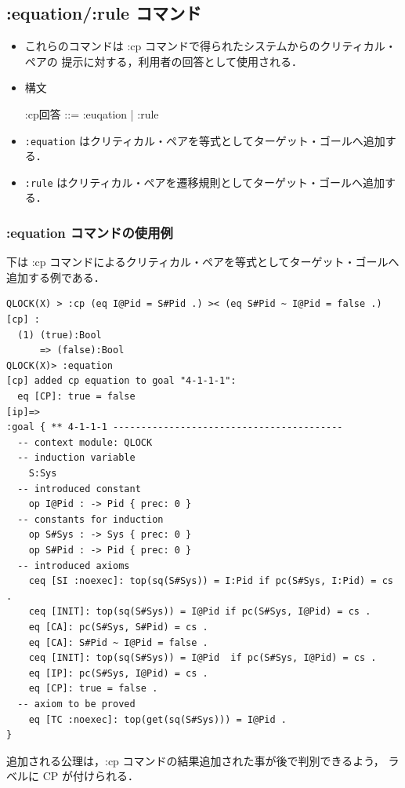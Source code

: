 \documentclass[a4paper,oneside,10pt,here]{memoir}
\newenvironment{vvtm}%
{\parskip=0pt\lineskip=0pt\begin{center}\begin{minipage}{0.8\textwidth}\begin{snugshade}}%
  {\end{snugshade}\end{minipage}\end{center}}
\begin{document}
\subsection{:equation/:rule コマンド}

\begin{itemize}
\item これらのコマンドは :cp コマンドで得られたシステムからのクリティカル・ペアの
  提示に対する，利用者の回答として使用される．
\item 構文
  \begin{vvtm}
    \begin{simplev}
      :cp回答 ::= :euqation | :rule
    \end{simplev}
  \end{vvtm}
\item \verb|:equation| はクリティカル・ペアを等式としてターゲット・ゴールへ追加する．
\item \verb|:rule| はクリティカル・ペアを遷移規則としてターゲット・ゴールへ追加する．
\end{itemize}

\subsubsection{:equation コマンドの使用例}
下は :cp コマンドによるクリティカル・ペアを等式としてターゲット・ゴールへ追加する例である．
\begin{verbatim}
QLOCK(X) > :cp (eq I@Pid = S#Pid .) >< (eq S#Pid ~ I@Pid = false .)
[cp] :
  (1) (true):Bool
      => (false):Bool
QLOCK(X)> :equation
[cp] added cp equation to goal "4-1-1-1": 
  eq [CP]: true = false
[ip]=>
:goal { ** 4-1-1-1 -----------------------------------------
  -- context module: QLOCK
  -- induction variable
    S:Sys
  -- introduced constant
    op I@Pid : -> Pid { prec: 0 }
  -- constants for induction
    op S#Sys : -> Sys { prec: 0 }
    op S#Pid : -> Pid { prec: 0 }
  -- introduced axioms
    ceq [SI :noexec]: top(sq(S#Sys)) = I:Pid if pc(S#Sys, I:Pid) = cs .
    ceq [INIT]: top(sq(S#Sys)) = I@Pid if pc(S#Sys, I@Pid) = cs .
    eq [CA]: pc(S#Sys, S#Pid) = cs .
    eq [CA]: S#Pid ~ I@Pid = false .
    ceq [INIT]: top(sq(S#Sys)) = I@Pid  if pc(S#Sys, I@Pid) = cs .
    eq [IP]: pc(S#Sys, I@Pid) = cs .
    eq [CP]: true = false .
  -- axiom to be proved
    eq [TC :noexec]: top(get(sq(S#Sys))) = I@Pid .
}
\end{verbatim}
追加される公理は，:cp コマンドの結果追加された事が後で判別できるよう，
ラベルに CP が付けられる．
\end{document}
